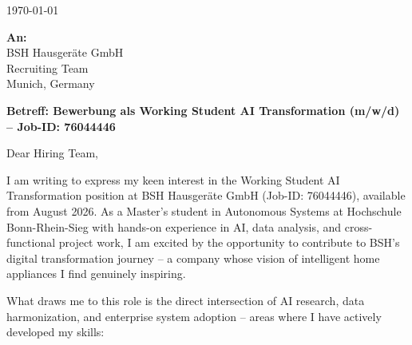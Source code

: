 \documentclass[a4paper,10pt]{article}
\begin{document}
\vspace{25pt}
\hspace{0.015\textwidth}
\begin{minipage}{0.97\textwidth}

\hfill \today

\vspace{15pt}

\textbf{An:} \\
BSH Hausgeräte GmbH \\
Recruiting Team \\
Munich, Germany

\vspace{20pt}

\textbf{Betreff: Bewerbung als Working Student AI Transformation (m/w/d) -- Job-ID: 76044446}

\vspace{20pt}

Dear Hiring Team,

\vspace{10pt}

I am writing to express my keen interest in the Working Student AI Transformation position at BSH Hausgeräte GmbH (Job-ID: 76044446), available from August 2026. As a Master's student in Autonomous Systems at Hochschule Bonn-Rhein-Sieg with hands-on experience in AI, data analysis, and cross-functional project work, I am excited by the opportunity to contribute to BSH's digital transformation journey -- a company whose vision of intelligent home appliances I find genuinely inspiring.

\vspace{10pt}

What draws me to this role is the direct intersection of AI research, data harmonization, and enterprise system adoption -- areas where I have actively developed my skills:


\end{minipage}
\end{document}
